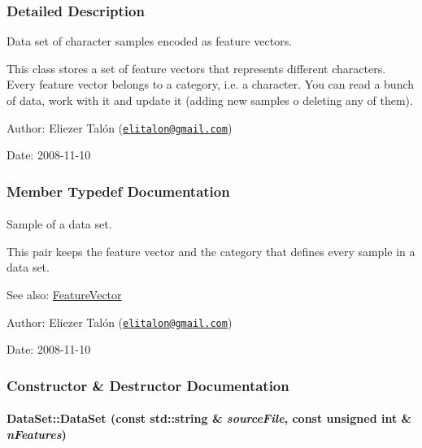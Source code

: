 \subsubsection{Detailed Description}
Data set of character samples encoded as feature vectors. 

This class stores a set of feature vectors that represents different characters. Every feature vector belongs to a category, i.e. a character. You can read a bunch of data, work with it and update it (adding new samples o deleting any of them).

\begin{Desc}
\item[Author:]Eliezer Talón (\href{mailto:elitalon@gmail.com}{\tt elitalon@gmail.com}) \end{Desc}
\begin{Desc}
\item[Date:]2008-11-10 \end{Desc}


\subsubsection{Member Typedef Documentation}
\hypertarget{class_data_set_7563096ce4847d88411ed3f6ad331310}{
\paragraph[{Sample}]{}\hfill}
\label{class_data_set_7563096ce4847d88411ed3f6ad331310}


Sample of a data set. 

This pair keeps the feature vector and the category that defines every sample in a data set.

\begin{Desc}
\item[See also:]\hyperlink{class_feature_vector}{FeatureVector}\end{Desc}
\begin{Desc}
\item[Author:]Eliezer Talón (\href{mailto:elitalon@gmail.com}{\tt elitalon@gmail.com}) \end{Desc}
\begin{Desc}
\item[Date:]2008-11-10 \end{Desc}


\subsubsection{Constructor \& Destructor Documentation}
\hypertarget{class_data_set_ffb28bf240421998cd5470f594a6bb22}{
\paragraph[{DataSet}]{\setlength{\rightskip}{0pt plus 5cm}DataSet::DataSet (const std::string \& {\em sourceFile}, \/  const unsigned int \& {\em nFeatures})}\hfill}
\label{class_data_set_ffb28bf240421998cd5470f594a6bb22}


